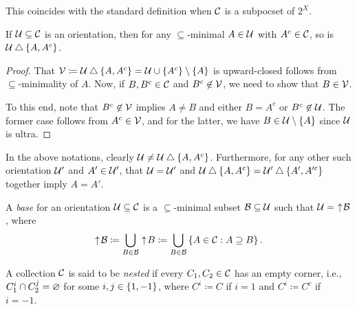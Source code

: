 \documentclass{amsart}
\begin{document}
    \begin{remark}
        This coincides with the standard definition when $\mc{C}$ is a subpocset of $2^X$.
    \end{remark}

    \begin{lemma}\label{tree-well-defined}
        If $\mc{U}\subseteq\mc{C}$ is an orientation, then for any $\subseteq$-minimal $A\in\mc{U}$ with $A^c\in\mc{C}$, so is $\mc{U}\symdiff\l\{A,A^c\r\}$.
    \end{lemma}
    \begin{proof}
        That $\mc{V}\coloneqq\mc{U}\symdiff\l\{A,A^c\r\}=\mc{U}\cup\l\{A^c\r\}\comp\l\{A\r\}$ is upward-closed follows from $\subseteq$-minimality of $A$. Now, if $B,B^c\in\mc{C}$ and $B^c\not\in\mc{V}$, we need to show that $B\in\mc{V}$.

        To this end, note that $B^c\not\in\mc{V}$ implies $A\neq B$ and either $B=A^c$ or $B^c\not\in\mc{U}$. The former case follows from $A^c\in\mc{V}$, and for the latter, we have $B\in\mc{U}\comp\l\{A\r\}$ since $\mc{U}$ is ultra.
    \end{proof}

    \begin{remark}\label{tree-no-loops}
        In the above notations, clearly $\mc{U}\neq\mc{U}\symdiff\l\{A,A^c\r\}$. Furthermore, for any other such orientation $\mc{U}'$ and $A'\in\mc{U}'$, that $\mc{U}=\mc{U}'$ and $\mc{U}\symdiff\l\{A,A^c\r\}=\mc{U}'\symdiff\l\{A',A'^c\r\}$ together imply $A=A'$.
    \end{remark}

    \begin{definition}
        A \textit{base} for an orientation $\mc{U}\subseteq\mc{C}$ is a $\subseteq$-minimal subset $\mc{B}\subseteq\mc{U}$ such that $\mc{U}=\,\,\uparrow\!\mc{B}$, where
        \begin{equation*}
            \uparrow\!\mc{B}\coloneqq\bigcup_{B\in\mc{B}}\uparrow\!B\coloneqq\bigcup_{B\in\mc{B}}\l\{A\in\mc{C}\st A\supseteq B\r\}.
        \end{equation*}
    \end{definition}

    \begin{definition}
        A collection $\mc{C}$ is said to be \textit{nested} if every $C_1,C_2\in\mc{C}$ has an empty corner, i.e., $C_1^i\cap C_2^j=\em$ for some $i,j\in\l\{1,-1\r\}$, where $C^i\coloneqq C$ if $i=1$ and $C^i\coloneqq C^c$ if $i=-1$.
    \end{definition}
\end{document}
